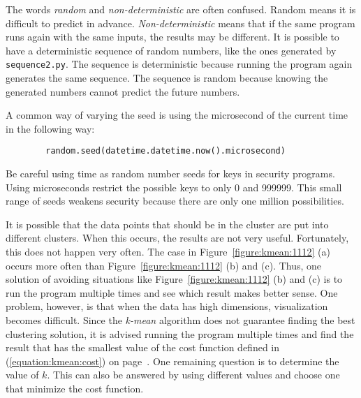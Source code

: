 \resetlinenumber[1]
\linenumbers
\begin{tt}
  
\end{tt}
\nolinenumbers


The words {\it random} and {\it non-deterministic} are often confused.
Random means it is difficult to predict in advance.  {\it
  Non-deterministic} means that if the same program runs again with
the same inputs, the results may be different.  It is possible to have
a deterministic sequence of random numbers, like the ones generated by
{\tt sequence2.py}.  The sequence is deterministic because running the
program again generates the same sequence. The sequence is random
because knowing the generated numbers cannot predict the future
numbers.



A common way of varying the seed is using the microsecond of the
current time in the following way:

\begin{verbatim}
        random.seed(datetime.datetime.now().microsecond)
\end{verbatim}

Be careful using time as random number seeds for keys in security
programs.  Using microseconds restrict the possible keys to only 0 and
999999.  This small range of seeds weakens security because there are
only one million possibilities.

It is possible that the data points that should be in the cluster are
put into different clusters. When this occurs, the results are not
very useful. Fortunately, this does not happen very often.  The case
in Figure~\ref{figure:kmean:1112} (a) occurs more often than
Figure~\ref{figure:kmean:1112} (b) and (c).  Thus, one solution of
avoiding situations like Figure~\ref{figure:kmean:1112} (b) and (c) is
to run the program multiple times and see which result makes better
sense.  One problem, however, is that when the data has high
dimensions, visualization becomes difficult.  Since the {\it k-mean}
algorithm does not guarantee finding the best clustering solution, it
is advised running the program multiple times and find the result that
has the smallest value of the cost function defined in
(\ref{equation:kmean:cost}) on page~\pageref{equation:kmean:cost}.
One remaining question is to determine the value of $k$.  This can
also be answered by using different values and choose one that
minimize the cost function.

